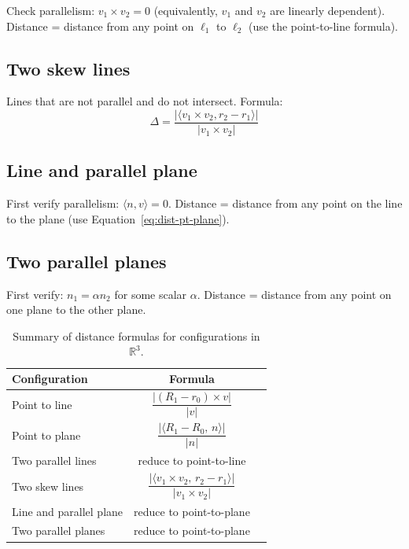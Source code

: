 \documentclass[11pt]{article}
\theoremstyle{plain}
\theoremstyle{definition}
\newcommand{\R}{\mathbb{R}}
\newcommand{\rthree}{$\R^3$}
\newcommand{\ip}[2]{\langle #1,\, #2 \rangle}
\begin{document}
Check parallelism: $v_1 \times v_2 = 0$ (equivalently, $v_1$ and $v_2$ are linearly dependent).
Distance = distance from any point on $\ell_1$ to $\ell_2$ (use the point-to-line formula).

\subsection{Two skew lines}

Lines that are not parallel and do not intersect. Formula:
\[
\Delta = \frac{|\langle v_1 \times v_2, r_2 - r_1 \rangle|}{|v_1 \times v_2|}
\]

\subsection{Line and parallel plane}

First verify parallelism: $\langle n, v \rangle = 0$.
Distance = distance from any point on the line to the plane (use Equation~\eqref{eq:dist-pt-plane}).

\subsection{Two parallel planes}

First verify: $n_1 = \alpha n_2$ for some scalar $\alpha$.
Distance = distance from any point on one plane to the other plane.

\begin{table}[H]
\centering
\begin{tabular}{|l || c | c|}
\hline
\textbf{Configuration} & \textbf{Formula} \\
\hline
\hline
Point to line & $\dfrac{|(R_1 - r_0) \times v|}{|v|}$ \\[10pt]
\hline
Point to plane & $\dfrac{|\ip{R_1 - R_0}{n}|}{|n|}$ \\[10pt]
\hline
Two parallel lines & reduce to point-to-line \\[4pt]
\hline
Two skew lines & $\dfrac{|\ip{v_1 \times v_2}{r_2 - r_1}|}{|v_1 \times v_2|}$ \\[10pt]
\hline
Line and parallel plane & reduce to point-to-plane \\[4pt]
\hline
Two parallel planes & reduce to point-to-plane \\[4pt]
\hline
\end{tabular}
\caption{Summary of distance formulas for configurations in \rthree.}
\label{tab:distances}
\end{table}
\end{document}
